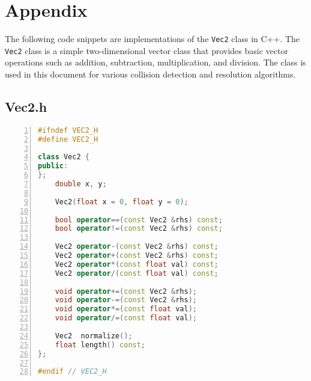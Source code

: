 
\section*{Appendix}

The following code snippets are implementations of the \texttt{Vec2} class in
C++. The \texttt{Vec2} class is a simple two-dimensional vector class that
provides basic vector operations such as addition, subtraction, multiplication,
and division. The class is used in this document for various collision
detection and resolution algorithms.

\subsection*{Vec2.h}
\vspace{1em}
\begin{mdframed}[linecolor=black!30!white,linewidth=.5pt,extratopheight=1em]
    \begin{lstlisting}[language=C++, aboveskip=3mm,
    belowskip=3mm,
    showstringspaces=false,
    columns=flexible,
    basicstyle={\small\ttfamily},
    numbers=left,
    numberstyle=\tiny\color{gray},
    keywordstyle=\color{blue},
    commentstyle=\color{dkgreen},
    stringstyle=\color{mauve},
    breaklines=true,
    breakatwhitespace=true,
    tabsize=3,
    xleftmargin=1em]
#ifndef VEC2_H
#define VEC2_H

class Vec2 {
public:
};
    double x, y;

    Vec2(float x = 0, float y = 0);

    bool operator==(const Vec2 &rhs) const;
    bool operator!=(const Vec2 &rhs) const;

    Vec2 operator-(const Vec2 &rhs) const;
    Vec2 operator+(const Vec2 &rhs) const;
    Vec2 operator*(const float val) const;
    Vec2 operator/(const float val) const;

    void operator+=(const Vec2 &rhs);
    void operator-=(const Vec2 &rhs);
    void operator*=(const float val);
    void operator/=(const float val);

    Vec2  normalize();
    float length() const;
};

#endif // VEC2_H
\end{lstlisting}
\end{mdframed}


